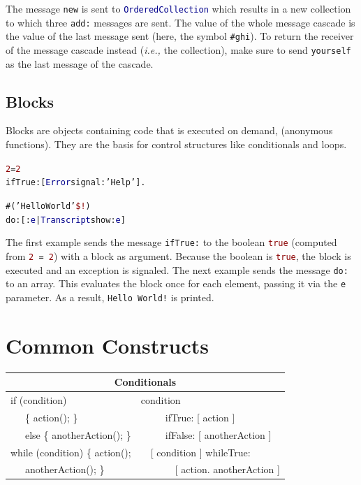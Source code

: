 \documentclass[notumble]{leaflet}
\makeatletter
\newcommand{\ie}{\emph{i.e.,}\xspace}
\newenvironment{displaycode}{%
     \par
     \hspace{1.5em}\begin{minipage}{\linewidth}
       \begin{alltt}\small}{
       \end{alltt}
     \end{minipage}
     \par}
\newcommand{\code}[1]{\foreignlanguage{english}{\texttt{#1}}}
\makeatother
\begin{document}
The message \code{new} is sent to \code{\textcolor{darkBlue}{OrderedCollection}} which
results in a new collection to which three
\code{add:} messages are sent. The value of the whole message cascade
is the value of the last message sent (here, the symbol
\textcolor{string}{\code{\#ghi}}). To return the receiver of the
message cascade instead (\ie the collection), make sure to send
\code{yourself} as the last message of the cascade.

\subsection{Blocks}
Blocks are objects containing code that is executed on demand,
(anonymous functions). They are the basis for control structures like
conditionals and loops.

\begin{displaycode}
\textcolor{darkRed}{2} = \textcolor{darkRed}{2}
  ifTrue: [\textcolor{darkBlue}{Error} signal: \textcolor{string}{'Help'}].
  
\#(\textcolor{string}{'Hello World'} \textcolor{darkRed}{\$!})
  do: [ :\textcolor{darkBlue}{e} | \textcolor{darkBlue}{Transcript} show: \textcolor{darkBlue}{e}]
\end{displaycode}

The first example sends the message \code{ifTrue:} to the boolean
\textcolor{darkRed}{\code{true}} (computed from
\code{\textcolor{darkRed}{2} = \textcolor{darkRed}{2}}) with a block
as argument. Because the boolean is \textcolor{darkRed}{\code{true}},
the block is executed and an exception is signaled. The next example
sends the message \code{do:} to an array. This evaluates the block
once for each element, passing it via the \code{e} parameter. As a
result, \code{\textcolor{string}{Hello~World!}} is printed.


\section{Common Constructs}

\noindent
\begin{tabularx}{\linewidth}{@{}lX@{}}
        \toprule
        \multicolumn{2}{c}{\textbf{Conditionals}}\\
        \midrule
        if (condition) & condition \\
      \ \ \   \{ action(); \} &   \ \ \ \ \    ifTrue: [ action ] \\
      \ \ \     else \{ anotherAction(); \}&\ \ \ \ \  ifFalse: [ anotherAction ]\\
       \midrule
      while (condition) \{ action(); &\ \  [ condition ] whileTrue:\\
      \ \ \     anotherAction(); \}&\ \ \ \ \ \ \  [ action. anotherAction ]
\end{tabularx}
\end{document}
